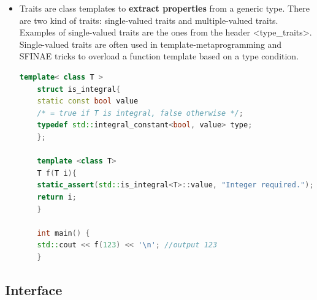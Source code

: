 \documentclass[a4paper,12pt,twoside]{book}
\begin{document}
\begin{itemize}
	\item Traits are class templates to \textbf{extract properties} from a generic type. There are two kind of traits: single-valued traits and multiple-valued traits. Examples of single-valued traits are the ones from the header <type\_traits>. Single-valued traits are often used in template-metaprogramming and SFINAE tricks to overload a function template based on a type condition.
	\begin{lstlisting}[frame=single, language=c++]
	template< class T >
	struct is_integral{
	static const bool value
	/* = true if T is integral, false otherwise */;
	typedef std::integral_constant<bool, value> type;
	};
	
	template <class T>
	T f(T i){
	static_assert(std::is_integral<T>::value, "Integer required.");
	return i;
	}
	
	int main() {
	std::cout << f(123) << '\n'; //output 123
	}
	\end{lstlisting}
\end{itemize}
\subsection{Interface}
\end{document}
